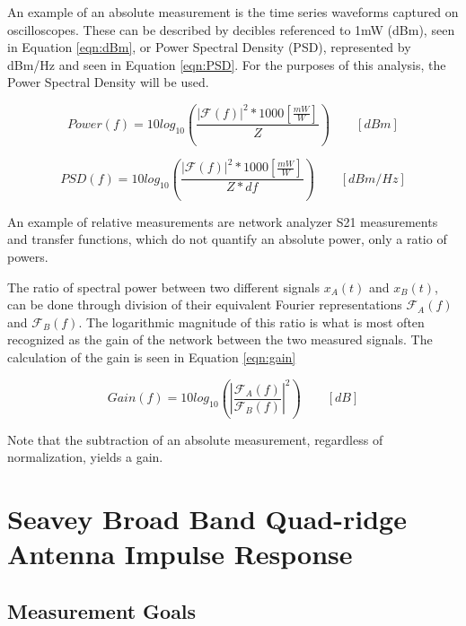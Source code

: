 	An example of an absolute measurement is the time series waveforms captured on oscilloscopes.  These can be described by decibles referenced to 1mW (dBm), seen in Equation \ref{eqn:dBm}, or Power Spectral Density (PSD), represented by dBm/Hz and seen in Equation \ref{eqn:PSD}.  For the purposes of this analysis, the Power Spectral Density will be used.
	
\begin{equation}
Power(f) = 10log_{10}(\frac{|\mathcal{F}(f)|^{2} * 1000[\frac{mW}{W}]} {Z})\qquad [dBm]
\label{eqn:dBm}
\end{equation}

	
\begin{equation}
PSD(f) = 10log_{10}(\frac{|\mathcal{F}(f)|^{2} * 1000[\frac{mW}{W}]} {Z*df})\qquad [dBm/Hz]
\label{eqn:PSD}
\end{equation}

	
	An example of relative measurements are network analyzer S21 measurements and transfer functions, which do not quantify an absolute power, only a ratio of powers.

	The ratio of spectral power between two different signals $x_{A}(t)$ and $x_{B}(t)$, can be done through division of their equivalent Fourier representations $\mathcal{F}_{A}(f)$ and $\mathcal{F}_{B}(f)$.  The logarithmic magnitude of this ratio is what is most often recognized as the gain of the network between the two measured signals.  The calculation of the gain is seen in Equation \ref{eqn:gain}
	
\begin{equation}
Gain(f) = 10log_{10}(|\frac{\mathcal{F}_{A}(f)}{\mathcal{F}_{B}(f)}|^{2}) \qquad [dB]
\label{eqn:gain}
\end{equation}


	Note that the subtraction of an absolute measurement, regardless of normalization, yields a gain.


\section{Seavey Broad Band Quad-ridge Antenna Impulse Response}

	\subsection{Measurement Goals}

